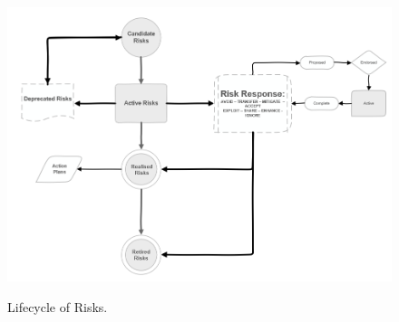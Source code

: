 \begin{figure}[t]
\caption{Lifecycle of Risks.}
\centering
\includegraphics[width=\textwidth]{risk-lifecycle-temp}
\label{fig:risk-lifecycle}
\end{figure}
